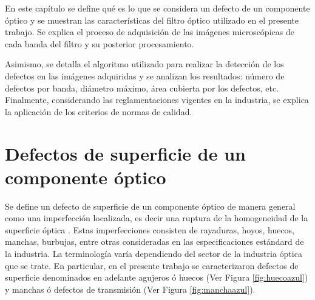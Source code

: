 

\singlespacing
{}

\hspace{0.5cm}En este capítulo se define qué es lo que se considera un defecto de un componente óptico y se muestran las características del filtro óptico utilizado en el presente trabajo. Se explica el proceso de adquisición de las imágenes microscópicas de cada banda del filtro y su posterior procesamiento. 

Asimismo, se detalla el algoritmo utilizado para realizar la detección de los defectos en las imágenes adquiridas y se analizan los resultados: número de defectos por banda, diámetro máximo, área cubierta por los defectos, etc. Finalmente, considerando las reglamentaciones vigentes en la industria, se explica la aplicación de los criterios de normas de calidad.

\singlespacing
\section{Defectos de superficie de un componente óptico}
\label{sec:defectsurf}



\hspace{0.5cm}Se define un defecto de superficie de un componente óptico de manera general como una imperfección localizada, es decir una ruptura de la homogeneidad de la superficie óptica \cite{Gomez_1998}. Estas imperfecciones consisten de rayaduras, hoyos, huecos, manchas, burbujas, entre otras consideradas en las especificaciones estándard de la industria. La terminología varía dependiendo del sector de la industria óptica que se trate. En particular, en el presente trabajo se caracterizaron defectos de superficie denominados en adelante agujeros ó huecos (Ver Figura \ref{fig:huecoazul}) y manchas ó defectos de transmisión (Ver Figura \ref{fig:manchaazul}).  

